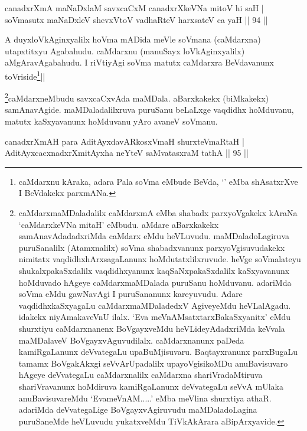 \begin{shl}
canadxrXmA maNaDxlaM savxcaCxM canadxrXkeVNa mitoV hi saH | \\
soVmasutx maNaDxleV shevxVtoV vadhaRteV harxsateV ca yaH \hfill|| 94 || 
\end{shl}

\begin{artha}
A duyxloVkAginxyalilx hoVma mADida meVle soVmana (caMdarxna) 
utapxtitxyu Agabahudu. caMdarxnu (manuSayx loVkAginxyalilx) 
aMgAravAgabahudu. I riVtiyAgi soVma matutx caMdarxra BeVdavanunx 
toVriside\footnote[2]{caMdarxnu kAraka, adara Pala soVma eMbude BeVda, 
`\stext' eMba shAsatxrXve I BeVdakekx parxmANa.}||
\end{artha}

\begin{artha}
\footnote[3]{caMdarxmaMDaladalilx caMdarxmA eMba shabadx parxyoVgakekx 
kAraNa `caMdarxkeVNa mitaH' eMbudu. aMdare aBarxkakekx 
samAnavAdadadxriMda caMdarx eMdu heVLuvudu. maMDaladoLagiruva 
puruSanalilx (Atamxnalilx) soVma shabadxvanunx parxyoVgisuvudakekx 
nimitatx vaqdidhxhArxsagaLanunx hoMdutatxlilxruvude. heVge soVmalateyu 
shukalxpakaSxdalilx vaqdidhxyanunx kaqSaNxpakaSxdalilx kaSxyavanunx 
hoMduvado hAgeye caMdarxmaMDalada puruSanu hoMduvanu. adariMda soVma 
eMdu gawNavAgi I puruSananunx kareyuvudu. Adare vaqdidhxkaSxyagaLu 
caMdarxmaMDaladedxV AgiveyeMdu heVLalAgadu. idakekx niyAmakaveVnU 
ilalx. `Eva meVnAMsatxtarxBakaSxyanitx' eMdu shurxtiyu caMdarxnanenx 
BoVgayxveMdu heVLideyAdadxriMda keVvala maMDalaveV 
BoVgayxvAguvudilalx. caMdarxnanunx paDeda kamiRgaLanunx deVvategaLu 
upaBuMjisuvaru. Baqtayxranunx parxBugaLu tamamx BoVgakAkxgi 
seVvArUpadalilx upayoVgisikoMDu anuBavisuvaro hAgeye deVvategaLu 
caMdarxnalilx caMdarxna shariVradaMtiruva shariVravanunx hoMdiruva 
kamiRgaLanunx deVvategaLu seVvA mUlaka anuBavisuvareMdu 
`EvameVnAM.....' eMba meVlina shurxtiya athaR. adariMda deVvategaLige 
BoVgayxvAgiruvudu maMDaladoLagina puruSaneMde heVLuvudu yukatxveMdu 
TiVkAkArara aBipArxyavide.}caMdarxneMbudu savxcaCxvAda maMDala. aBarxkakekx 
(biMkakekx) samAnavAgide. maMDaladalilxruva puruSanu beLaLxge vaqdidhx 
hoMduvanu, matutx kaSxyavanunx hoMduvanu yAro avaneV soVmanu.
\end{artha}

\begin{shl}
canadxrXmAH para AditAyxdavARkosxVmaH shurxteVmaRtaH | \\
AditAyxcacxnadxrXmitAyxha neYteV saMvatasxraM tathA \hfill|| 95 || 
\end{shl}

